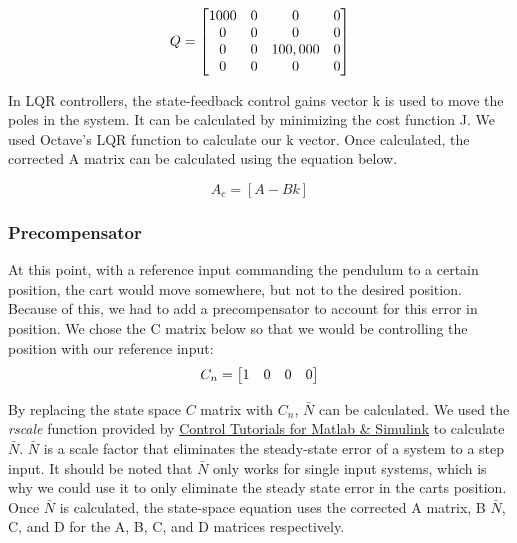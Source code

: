 \documentclass{article}
\begin{document}
 \begin{equation} 
\label{q}
\centering
Q = \begin{bmatrix}
	1000&0&0&0\\
	0&0&0&0\\
	0&0&100,000&0\\
	0&0&0&0\\
	\end{bmatrix}
\end{equation}

In LQR controllers, the state-feedback control gains vector k is used to move the poles in the system. It can be calculated by minimizing the cost function J. We used Octave's LQR function to calculate our k vector. Once calculated, the corrected A matrix can be calculated using the equation below.

\begin{equation}
\label{ac}
A_c=[A-Bk]
\end{equation}

\subsubsection{Precompensator}
At this point, with a reference input commanding the pendulum to a certain position, the cart would move somewhere, but not to the desired position. Because of this, we had to add a precompensator to account for this error in position. We chose the C matrix below so that we would be controlling the position with our reference input:
\\

\begin{equation}
\label{pcomp}
\centering
C_n = \begin{bmatrix}
1 & 0 & 0 & 0
\end{bmatrix}
\end{equation}
 
By replacing the state space $C$ matrix with $C_n$, $\bar{N}$ can be calculated. We used the \textit{rscale} function provided by \href{http://ctms.engin.umich.edu/CTMS/index.php?aux=Extras_rscale}{Control Tutorials for Matlab \& Simulink} to calculate $\bar{N}$. $\bar{N}$ is a scale factor that eliminates the steady-state error of a system to a step input. It should be noted that $\bar{N}$ only works for single input systems, which is why we could use it to only eliminate the steady state error in the carts position. Once $\bar{N}$ is calculated, the state-space equation uses the corrected A matrix, B $\bar{N}$, C, and D for the A, B, C, and D matrices respectively.
 
\end{document}
